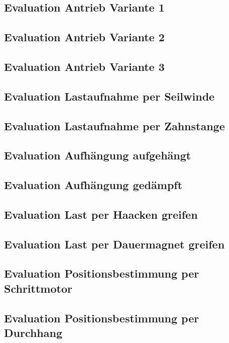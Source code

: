 \documentclass[a4paper]{report}
\begin{document}
\subsection{Evaluation Antrieb Variante 1}


\subsection{Evaluation Antrieb Variante 2}


\subsection{Evaluation Antrieb Variante 3}


\subsection{Evaluation Lastaufnahme per Seilwinde}


\subsection{Evaluation Lastaufnahme per Zahnstange}


\subsection{Evaluation Aufhängung aufgehängt}


\subsection{Evaluation Aufhängung gedämpft}


\subsection{Evaluation Last per Haacken greifen}


\subsection{Evaluation Last per Dauermagnet greifen}


\subsection{Evaluation Positionsbestimmung per Schrittmotor}


\subsection{Evaluation Positionsbestimmung per Durchhang}
\end{document}
